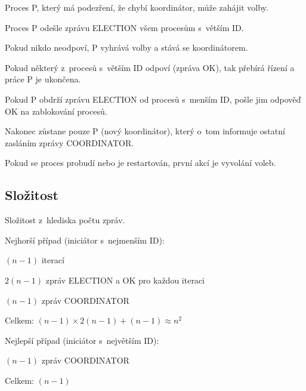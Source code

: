 \begin{compactitem}
    \item Proces P, který má podezření, že chybí koordinátor, může zahájit volby.
    \begin{compactenum}
        \item Proces P odešle zprávu ELECTION všem procesům s~větším ID.
        \item Pokud nikdo neodpoví, P vyhrává volby a stává se koordinátorem.
        \item Pokud některý z~procesů s~větším ID odpoví (zpráva OK), tak přebírá řízení a práce P je ukončena.
        \item Pokud P obdrží zprávu ELECTION od procesů s~menším ID, pošle jim odpověď OK na zablokování procesů.
    \end{compactenum}
    \item Nakonec zůstane pouze P (nový koordinátor), který o~tom informuje ostatní zasláním zprávy COORDINATOR.
    \item Pokud se proces probudí nebo je restartován, první akcí je vyvolání voleb.
\end{compactitem}

\subsection{Složitost}

\begin{compactitem}
    \item Složitost z~hlediska počtu zpráv.

    \item Nejhorší případ (iniciátor s~nejmenším ID): \begin{compactitem}
        \item $(n-1)$ iterací
        \item $2(n-1)$ zpráv ELECTION a OK pro každou iteraci
        \item $(n-1)$ zpráv COORDINATOR
        \item Celkem: $(n-1) \times 2(n-1) + (n-1) \approx n^2$
    \end{compactitem}

    \item Nejlepší případ (iniciátor s~největším ID): \begin{compactitem}
        \item $(n-1)$ zpráv COORDINATOR
        \item Celkem: $(n-1)$
    \end{compactitem}
\end{compactitem}

